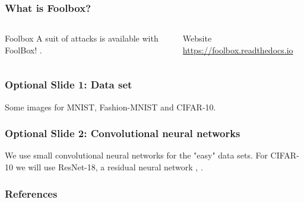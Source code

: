 \documentclass[10pt,usepdftitle=false,aspectratio=169]{beamer}
\begin{document}
\begin{frame}[fragile]
	\frametitle{What is Foolbox?}
	\begin{columns}
		\begin{column}{.45\columnwidth}
			\begin{block}{Foolbox}
				A suit of attacks is available with FoolBox! \cite{rauber2017foolbox}.
			\end{block}
		\end{column}
		\begin{column}{.55\columnwidth}
			\begin{alertblock}{Website}
				\url{https://foolbox.readthedocs.io}
			\end{alertblock}
		\end{column}
	\end{columns}
\end{frame}

\begin{frame}[fragile]
	\frametitle{Optional Slide 1: Data set}
	Some images for MNIST, Fashion-MNIST and CIFAR-10.
\end{frame}

\begin{frame}[fragile]
	\frametitle{Optional Slide 2: Convolutional neural networks}
	We use small convolutional neural networks \cite{lecun1999object} for the "easy" data sets. For CIFAR-10 we will use ResNet-18, a residual neural network \cite{he2016deep}, \cite{he2016identity}.
\end{frame}

\begin{frame}[allowframebreaks]
	\frametitle{References}
	
	
\end{frame}
\end{document}
